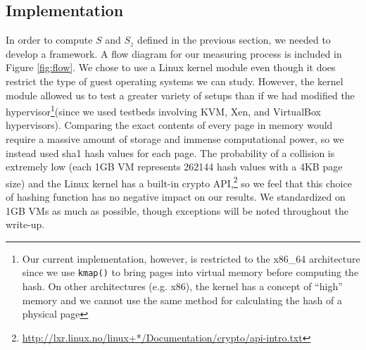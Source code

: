 \documentclass{acm_proc_article-sp}
\begin{document}
\subsection{Implementation}\label{sec:red_implementation}
In order to compute $S$ and $S_z$ defined in the previous section, we needed to develop a framework.  A flow diagram for our measuring process is included in Figure \ref{fig:flow}.  We chose to use a Linux kernel module even though it does restrict the type of guest operating systems we can study.  However, the kernel module allowed us to test a greater variety of setups than if we had modified the hypervisor\footnote{Our current implementation, however, is restricted to the x86\_64 architecture since we use {\tt kmap()} to bring pages into virtual memory before computing the hash.  On other architectures (e.g. x86), the kernel has a concept of ``high'' memory and we cannot use the same method for calculating the hash of a physical page}(since we used testbeds involving KVM, Xen, and VirtualBox hypervisors).  Comparing the exact contents of every page in memory would require a massive amount of storage and immense computational power, so we instead used sha1 hash values for each page.  The probability of a collision is extremely low (each 1GB VM represents 262144 hash values with a 4KB page size) and the Linux kernel has a built-in crypto API,\footnote{\url{http://lxr.linux.no/linux+*/Documentation/crypto/api-intro.txt}} so we feel that this choice of hashing function has no negative impact on our results.  We standardized on 1GB VMs as much as possible, though exceptions will be noted throughout the write-up.
\end{document}
